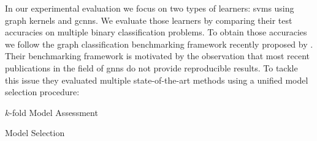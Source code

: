 In our experimental evaluation we focus on two types of learners:
\acp{svm} using graph kernels and \acp{gcnn}.
We evaluate those learners by comparing their test accuracies on multiple binary classification problems.
To obtain those accuracies we follow the graph classification benchmarking framework recently proposed by \citet{Errica2020}.
Their benchmarking framework is motivated by the observation that most recent publications in the field of \acp{gnn} do not provide reproducible results.
To tackle this issue they evaluated multiple state-of-the-art methods using a unified model selection procedure:\\
{\setlength{\intextsep}{0pt}
\begin{minipage}[t]{0.55\linewidth-1em}
	\begin{algorithm}[H]
		\caption{$k$-fold Model Assessment}\label{algo:eval:assessment}
		\begin{algorithmic}[1]
				\EndFor{}
			\EndFor{}
		\end{algorithmic}
	\end{algorithm}
\end{minipage}\hspace*{1em}%
\begin{minipage}[t]{0.45\linewidth}
	\begin{algorithm}[H]
		\caption{Model Selection}\label{algo:eval:selection}
		\begin{algorithmic}[1]
			\ForAll{$\theta \in \Theta$}
			\EndFor{}
			\EndFunction{}
		\end{algorithmic}
	\end{algorithm}
\end{minipage}}

